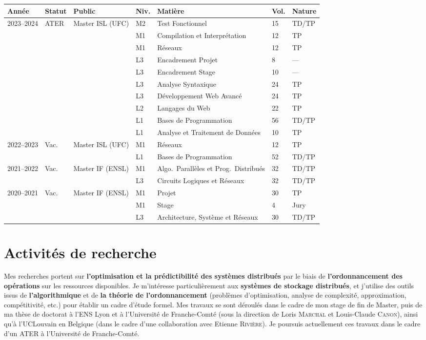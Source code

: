 \documentclass[12pt]{article}
\begin{document}
\begin{center}
    \footnotesize
    \begin{tabularx}{\linewidth}{p{2cm}lp{3cm}lXll}
        \toprule
        \textbf{Année} & \textbf{Statut} & \textbf{Public} & \textbf{Niv.} & \textbf{Matière} & \textbf{Vol.} & \textbf{Nature} \tabularnewline
        \midrule
        2023--2024 & ATER & Master ISL (UFC) & M2 & Test Fonctionnel & 15 & TD/TP \tabularnewline
        & & & M1 & Compilation et Interprétation & 12 & TP \tabularnewline
        & & & M1 & Réseaux & 12 & TP \tabularnewline
        & & & L3 & Encadrement Projet & 8 & --- \tabularnewline
        & & & L3 & Encadrement Stage & 10 & --- \tabularnewline
        & & & L3 & Analyse Syntaxique & 24 & TP \tabularnewline
        & & & L3 & Développement Web Avancé & 24 & TP \tabularnewline
        & & & L2 & Langages du Web & 22 & TP \tabularnewline
        & & & L1 & Bases de Programmation & 56 & TD/TP \tabularnewline
        & & & L1 & Analyse et Traitement de Données & 10 & TP \tabularnewline
        \midrule
        2022--2023 & Vac. & Master ISL (UFC) & M1 & Réseaux & 12 & TP \tabularnewline
        & & & L1 & Bases de Programmation & 52 & TD/TP \tabularnewline
        \midrule
        2021--2022 & Vac. & Master IF (ENSL) & M1 & Algo.\ Parallèles et Prog.\ Distribués & 32 & TD/TP \tabularnewline
        & & & L3 & Circuits Logiques et Réseaux & 32 & TD/TP \tabularnewline
        \midrule
        2020--2021 & Vac. & Master IF (ENSL) & M1 & Projet & 30 & TP \tabularnewline
        & & & M1 & Stage & 4 & Jury \tabularnewline
        & & & L3 & Architecture, Système et Réseaux & 30 & TD/TP \tabularnewline
        \bottomrule
    \end{tabularx}
\end{center}

\section{Activités de recherche}

Mes recherches portent sur \textbf{l'optimisation et la prédictibilité des systèmes distribués} par
le biais de \textbf{l'ordonnancement des opérations} sur les ressources disponibles.  
Je m'intéresse particulièrement aux \textbf{systèmes de stockage distribués}, et j'utilise des
outils issus de \textbf{l'algorithmique} et de \textbf{la théorie de l'ordonnancement} (problèmes
d'optimisation, analyse de complexité, approximation, compétitivité, etc.) pour établir un cadre
d'étude formel.  
Mes travaux se sont déroulés dans le cadre de mon stage de fin de Master, puis de ma thèse de
doctorat à l'ENS Lyon et à l'Université de Franche-Comté (sous la direction de Loris
\textsc{Marchal} et Louis-Claude \textsc{Canon}), ainsi qu'à l'UCLouvain en Belgique (dans le cadre
d'une collaboration avec Etienne \textsc{Rivière}).  
Je poursuis actuellement ces travaux dans le cadre d'un ATER à l'Université de Franche-Comté.
\end{document}
